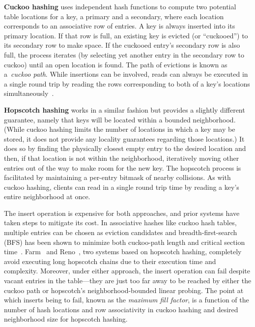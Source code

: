 
\textbf{Cuckoo hashing} uses independent hash functions to compute two
potential table locations for a key, a primary and a secondary, where
each location corresponds to an associative row of entries.  A key is
always inserted into its primary location.  If that row is full, an
existing key is evicted (or ``cuckooed'') to its secondary row to make
space. If the cuckooed entry's secondary row is also full, the process
iterates (by selecting yet another entry in the secondary row to
cuckoo) until an open location is found. The path of evictions is
known as a~\textit{cuckoo path}.  While insertions can be involved,
reads can always be executed in a single round trip by reading the
rows corresponding to both of a key's locations
simultaneously~\cite{pilaf}.

\textbf{Hopscotch hashing} works in a similar fashion but provides a
slightly different guarantee, namely that keys will be located within
a bounded neighborhood.  (While cuckoo hashing limits the number of
locations in which a key may be stored, it does not provide any
locality guarantees regarding those locations.) It does so by finding
the physically closest empty entry to the desired location and then,
if that location is not within the neighborhood, iteratively
moving other entries out of the way to make room for the new key.
The hopscotch process is facilitated by maintaining a per-entry
bitmask of nearby collisions.  As with cuckoo hashing, clients can read in a single round trip time by reading a key's entire
neighborhood at once.

The insert operation is expensive for both approaches, and prior
systems have taken steps to mitigate its cost.  In associative hashes
like cuckoo hash tables, multiple entries can be chosen as eviction
candidates and breadth-first-search (BFS) has been shown to minimize
both cuckoo-path length and critical section
time~\cite{memc3,cuckoo-improvements}.
Farm~\cite{farm} and Reno~\cite{reno}, two systems based on hopscotch
hashing, completely avoid executing long hopscotch chains due to their
execution time and complexity.  Moreover, under either approach, the
insert operation can fail despite vacant entries in the table---they
are just too far away to be reached by either the cuckoo path or
hopscotch's neighborhood-bounded linear probing.  The point at which
inserts being to fail, known as the \emph{maximum fill factor}, is a
function of the number of hash locations and row associativity in
cuckoo hashing and desired neighborhood size for hopscotch hashing.


